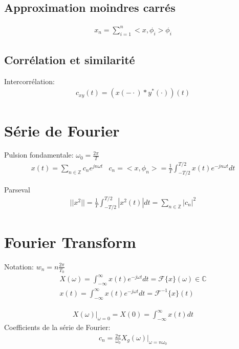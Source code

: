 \documentclass[a4paper]{amsart}
\begin{document}
\subsection{Approximation moindres carrés}
\begin{eqnarray}
	x_n=\sum_{i=1}^n<x,\phi_i>\phi_i
\end{eqnarray}
\subsection{Corrélation et similarité}
Intercorrélation:
\begin{eqnarray}
	c_{xy}(t)=(x(-\cdot)*y^*(\cdot))(t)
\end{eqnarray}

\section{Série de Fourier}
Pulsion fondamentale: $\omega_0=\frac{2\pi}{T}$
\begin{eqnarray}
	x(t)=\sum_{n\in\mathbb Z}c_ne^{jn\omega t} & c_n=<x,\phi_n>=\frac{1}{T}\int_{-T/2}^{T/2}x(t)e^{-jn\omega t}dt
\end{eqnarray}

Parseval
\begin{eqnarray}
	||x^2||=\frac{1}{T}\int_{-T/2}^{T/2}|x^2(t)|dt=\sum_{n\in\mathbb Z}|c_n|^2
\end{eqnarray}

\section{Fourier Transform}
Notation: $w_n=n\frac{2\pi}{T_0}$
\begin{eqnarray}
	X(\omega)=\int_{-\infty}^{\infty}x(t)e^{-j\omega t}dt=\mathcal{F}\{x\}(\omega)\in\mathbb C\\
	x(t)=\int_{-\infty}^{\infty}x(t)e^{-j\omega t}dt=\mathcal{F}^{-1}\{x\}(t)
\end{eqnarray}

\begin{eqnarray}
	X(\omega)|_{\omega=0}=X(0)=\int_{-\infty}^{\infty}x(t)dt
\end{eqnarray}
Coefficients de la série de Fourier:
\begin{eqnarray}
	c_n=\frac{2\pi}{\omega_0}X_g(\omega)\big|_{\omega=n\omega_0}
\end{eqnarray}
\end{document}
